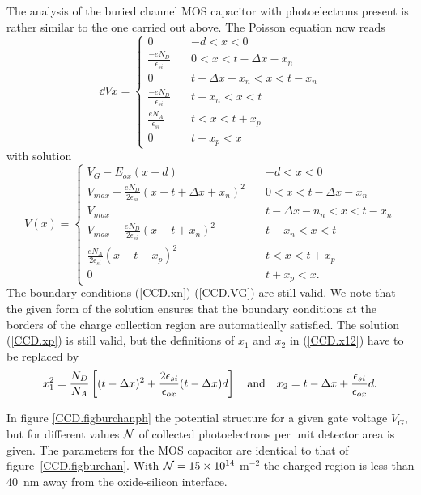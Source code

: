 The analysis of the buried channel MOS capacitor with photoelectrons
present is rather similar to the one carried out above. The Poisson
equation now reads
\begin{equation}
  \dd{V}{x} = \left\{ \begin{array}{ll} 
	0 & -d < x < 0 \\
	\frac{\displaystyle -eN_D}{\displaystyle \epsilon_{si}} \quad &
	0 < x < t-\Delta x -x_n \\
	0 & t-\Delta x -x_n < x < t -x_n \\
	\frac{\displaystyle -eN_D}{\displaystyle \epsilon_{si}} \quad &
	t-x_n < x < t \\
	\frac{\displaystyle eN_A}{\displaystyle\epsilon_{si}} & 
	t < x < t+x_p \\
	0 & t+x_p < x
  \end{array} \right.
  \label{CCD/.Poissonburph}
\end{equation}
with solution
\begin{equation}
  V(x) = \left\{ \begin{array}{ll} 
	V_G-E_{ox}(x+d) & -d < x < 0 \\
	V_{max} - \frac{\displaystyle
	eN_D}{\displaystyle 2\epsilon_{si}} (x-t+\Delta x +x_n)^2 \quad & 
	0 < x < t-\Delta x - x_n \\ 
	V_{max} & t-\Delta x - n_n < x < t - x_n \\
	V_{max} - \frac{\displaystyle
	eN_D}{\displaystyle 2\epsilon_{si}} (x-t+x_n)^2 \quad & 
	t - x_n < x < t \\ 
	\frac{\displaystyle eN_A}{\displaystyle
	2\epsilon_{si}}(x-t-x_p)^2 & t < x < t+x_p \\
	0 & t+x_p < x.
	\end{array} \right.
\end{equation}
The boundary conditions (\ref{CCD.xn})-(\ref{CCD.VG}) are still
valid. We note that the given form of the solution ensures that the
boundary conditions at the borders of the charge collection region are
automatically satisfied. The solution (\ref{CCD.xp}) is still
valid, but the definitions of $x_1$ and $x_2$ in (\ref{CCD.x12}) have
to be replaced by
\begin{equation}
  x_1^2 = \frac{N_D}{N_A}\left[(t-\Delta
  x)^2+\frac{2\epsilon_{si}}{\epsilon_{ox}}(t-\Delta x)d \right] 
  \quad {\rm and} \quad
  x_2 = t-\Delta x+\frac{\epsilon_{si}}{\epsilon_{ox}}d.
  \label{CCD.x12ph}
\end{equation}

In figure \ref{CCD.figburchanph} the potential structure for a given
gate voltage $V_G$, but for different values ${\cal N}$ of collected
photoelectrons per unit detector area is given. The parameters for
the MOS capacitor are identical to that of figure~\ref{CCD.figburchan}. 
With ${\cal N} = 15\times 10^{14}$ m$^{-2}$ the
charged region is less than 40~nm away from the oxide-silicon
interface.

